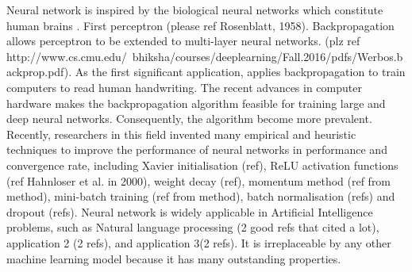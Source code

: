
Neural network is inspired by the biological neural networks which constitute human brains \citep{10.2307/4299364}. First perceptron (please ref Rosenblatt, 1958).
Backpropagation allows perceptron to be extended to multi-layer neural networks. (plz ref http://www.cs.cmu.edu/~bhiksha/courses/deeplearning/Fall.2016/pdfs/Werbos.backprop.pdf). As the first significant application, \citet{NIPS1989293} applies backpropagation to train computers to read human handwriting. The recent advances in computer hardware makes the backpropagation algorithm feasible for training large and deep neural networks. Consequently, the algorithm become more prevalent. Recently, researchers in this field invented many empirical and heuristic techniques to improve the performance of neural networks in performance and convergence rate, 
including Xavier initialisation (ref), ReLU activation functions (ref Hahnloser et al. in 2000), 
weight decay (ref), 
momentum method (ref from method),
mini-batch training (ref from method), batch normalisation (refs) and dropout (refs).
Neural network is widely applicable in Artificial Intelligence problems, such as Natural language processing (2 good refs that cited a lot), application 2 (2 refs), and application 3(2 refs).  It is irreplaceable by any other machine learning model because it has many outstanding properties. 


